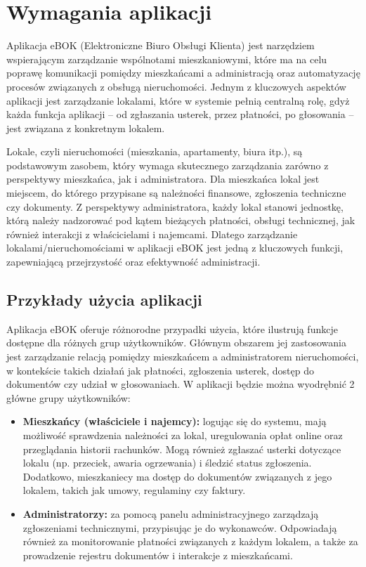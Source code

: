 \section{Wymagania aplikacji}

Aplikacja eBOK (Elektroniczne Biuro Obsługi Klienta) jest narzędziem wspierającym zarządzanie wspólnotami mieszkaniowymi, które ma na celu poprawę komunikacji pomiędzy mieszkańcami a administracją oraz automatyzację procesów związanych z obsługą nieruchomości. Jednym z kluczowych aspektów aplikacji jest zarządzanie lokalami, które w systemie pełnią centralną rolę, gdyż każda funkcja aplikacji – od zgłaszania usterek, przez płatności, po głosowania – jest związana z konkretnym lokalem.

Lokale, czyli nieruchomości (mieszkania, apartamenty, biura itp.), są podstawowym zasobem, który wymaga skutecznego zarządzania zarówno z perspektywy mieszkańca, jak i administratora. Dla mieszkańca lokal jest miejscem, do którego przypisane są należności finansowe, zgłoszenia techniczne czy dokumenty. Z perspektywy administratora, każdy lokal stanowi jednostkę, którą należy nadzorować pod kątem bieżących płatności, obsługi technicznej, jak również interakcji z właścicielami i najemcami. Dlatego zarządzanie lokalami/nieruchomościami w aplikacji eBOK jest jedną z kluczowych funkcji, zapewniającą przejrzystość oraz efektywność administracji.

\subsection{Przykłady użycia aplikacji}

Aplikacja eBOK oferuje różnorodne przypadki użycia, które ilustrują funkcje dostępne dla różnych grup użytkowników. Głównym obszarem jej zastosowania jest zarządzanie relacją pomiędzy mieszkańcem a administratorem nieruchomości, w kontekście takich działań jak płatności, zgłoszenia usterek, dostęp do dokumentów czy udział w głosowaniach. W aplikacji będzie można wyodrębnić 2 główne grupy użytkowników:

\begin{itemize} 

	\item \textbf{Mieszkańcy (właściciele i najemcy):} logując się do systemu, mają możliwość sprawdzenia należności za lokal, uregulowania opłat online oraz przeglądania historii rachunków. Mogą również zgłaszać usterki dotyczące lokalu (np. przeciek, awaria ogrzewania) i śledzić status zgłoszenia. Dodatkowo, mieszkaniecy ma dostęp do dokumentów związanych z jego lokalem, takich jak umowy, regulaminy czy faktury.
	
	\item \textbf{Administratorzy:} za pomocą panelu administracyjnego zarządzają zgłoszeniami technicznymi, przypisując je do wykonawców. Odpowiadają również za monitorowanie płatności związanych z każdym lokalem, a także za prowadzenie rejestru dokumentów i interakcje z mieszkańcami.
	
\end{itemize}

